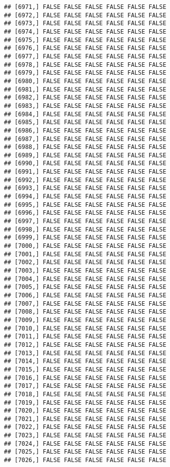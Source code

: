 \documentclass[
]{article}
\begin{document}
\begin{verbatim}
## [6971,] FALSE FALSE FALSE FALSE FALSE FALSE
## [6972,] FALSE FALSE FALSE FALSE FALSE FALSE
## [6973,] FALSE FALSE FALSE FALSE FALSE FALSE
## [6974,] FALSE FALSE FALSE FALSE FALSE FALSE
## [6975,] FALSE FALSE FALSE FALSE FALSE FALSE
## [6976,] FALSE FALSE FALSE FALSE FALSE FALSE
## [6977,] FALSE FALSE FALSE FALSE FALSE FALSE
## [6978,] FALSE FALSE FALSE FALSE FALSE FALSE
## [6979,] FALSE FALSE FALSE FALSE FALSE FALSE
## [6980,] FALSE FALSE FALSE FALSE FALSE FALSE
## [6981,] FALSE FALSE FALSE FALSE FALSE FALSE
## [6982,] FALSE FALSE FALSE FALSE FALSE FALSE
## [6983,] FALSE FALSE FALSE FALSE FALSE FALSE
## [6984,] FALSE FALSE FALSE FALSE FALSE FALSE
## [6985,] FALSE FALSE FALSE FALSE FALSE FALSE
## [6986,] FALSE FALSE FALSE FALSE FALSE FALSE
## [6987,] FALSE FALSE FALSE FALSE FALSE FALSE
## [6988,] FALSE FALSE FALSE FALSE FALSE FALSE
## [6989,] FALSE FALSE FALSE FALSE FALSE FALSE
## [6990,] FALSE FALSE FALSE FALSE FALSE FALSE
## [6991,] FALSE FALSE FALSE FALSE FALSE FALSE
## [6992,] FALSE FALSE FALSE FALSE FALSE FALSE
## [6993,] FALSE FALSE FALSE FALSE FALSE FALSE
## [6994,] FALSE FALSE FALSE FALSE FALSE FALSE
## [6995,] FALSE FALSE FALSE FALSE FALSE FALSE
## [6996,] FALSE FALSE FALSE FALSE FALSE FALSE
## [6997,] FALSE FALSE FALSE FALSE FALSE FALSE
## [6998,] FALSE FALSE FALSE FALSE FALSE FALSE
## [6999,] FALSE FALSE FALSE FALSE FALSE FALSE
## [7000,] FALSE FALSE FALSE FALSE FALSE FALSE
## [7001,] FALSE FALSE FALSE FALSE FALSE FALSE
## [7002,] FALSE FALSE FALSE FALSE FALSE FALSE
## [7003,] FALSE FALSE FALSE FALSE FALSE FALSE
## [7004,] FALSE FALSE FALSE FALSE FALSE FALSE
## [7005,] FALSE FALSE FALSE FALSE FALSE FALSE
## [7006,] FALSE FALSE FALSE FALSE FALSE FALSE
## [7007,] FALSE FALSE FALSE FALSE FALSE FALSE
## [7008,] FALSE FALSE FALSE FALSE FALSE FALSE
## [7009,] FALSE FALSE FALSE FALSE FALSE FALSE
## [7010,] FALSE FALSE FALSE FALSE FALSE FALSE
## [7011,] FALSE FALSE FALSE FALSE FALSE FALSE
## [7012,] FALSE FALSE FALSE FALSE FALSE FALSE
## [7013,] FALSE FALSE FALSE FALSE FALSE FALSE
## [7014,] FALSE FALSE FALSE FALSE FALSE FALSE
## [7015,] FALSE FALSE FALSE FALSE FALSE FALSE
## [7016,] FALSE FALSE FALSE FALSE FALSE FALSE
## [7017,] FALSE FALSE FALSE FALSE FALSE FALSE
## [7018,] FALSE FALSE FALSE FALSE FALSE FALSE
## [7019,] FALSE FALSE FALSE FALSE FALSE FALSE
## [7020,] FALSE FALSE FALSE FALSE FALSE FALSE
## [7021,] FALSE FALSE FALSE FALSE FALSE FALSE
## [7022,] FALSE FALSE FALSE FALSE FALSE FALSE
## [7023,] FALSE FALSE FALSE FALSE FALSE FALSE
## [7024,] FALSE FALSE FALSE FALSE FALSE FALSE
## [7025,] FALSE FALSE FALSE FALSE FALSE FALSE
## [7026,] FALSE FALSE FALSE FALSE FALSE FALSE

\end{verbatim}
\end{document}
